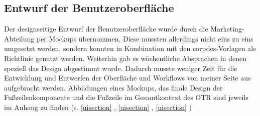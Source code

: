 \subsection{Entwurf der Benutzeroberfläche}
\label{benutzeroberfläche}
Der designseitige Entwurf der Benutzeroberfläche wurde durch die Marketing-Abteilung per Mockups übernommen. Diese mussten allerdings nicht eins zu eins umgesetzt werden, sondern konnten in Kombination mit den \gls{corpdes}-Vorlagen als Richtlinie genutzt werden. Weiterhin gab es wöchentliche Absprachen in denen speziell das Design abgestimmt wurde. Dadurch musste weniger Zeit für die Entwicklung und Entwerfen der Oberfläche und Workflows von meiner Seite aus aufgebracht werden. Abbildungen eines Mockups, das finale Design der Fußzeilenkomponente und die Fußzeile im Gesamtkontext des \ac{OTR} sind jeweils im Anhang zu finden (s. \ref{uisection} , \ref{uisection} , \ref{uisection} )
